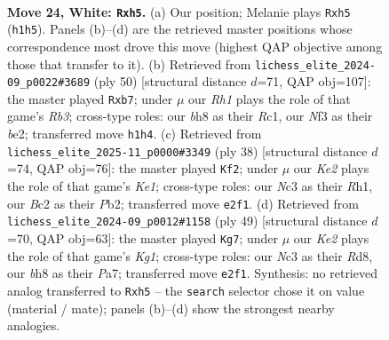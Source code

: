 \documentclass[11pt]{article}
\begin{document}
\clearpage

\begin{figure}[p]\centering
\begin{subfigure}{0.46\textwidth}\centering
\resizebox{\linewidth}{!}{%
\newchessgame
\chessboard[
  setfen={r4r1b/1ppb1k2/p7/4pp1p/2n5/P1N2N2/1PB1KPP1/R1B4R w - - 0 24},
  showmover=false,
  pgfstyle=straightmove, color=movearrow, markmove={h1-h5}
]}
\caption{}
\end{subfigure}\hfill
\begin{subfigure}{0.46\textwidth}\centering
\resizebox{\linewidth}{!}{%
\newchessgame
\chessboard[
  setfen={1n3rk1/1p3ppp/3N4/4P3/2Pp2nN/1R4P1/r3bpBP/2R4K w - - 1 26},
  showmover=false,
  pgfstyle=straightmove, color=movearrow, markmove={b3-b7}
]}
\caption{}
\end{subfigure}
\\[4pt]
\begin{subfigure}{0.46\textwidth}\centering
\resizebox{\linewidth}{!}{%
\newchessgame
\chessboard[
  setfen={r6r/4kpbp/p2p2p1/3np3/R1N5/5P2/1PP1B1PP/4K2R w K - 2 20},
  showmover=false,
  pgfstyle=straightmove, color=movearrow, markmove={e1-f2}
]}
\caption{}
\end{subfigure}\hfill
\begin{subfigure}{0.46\textwidth}\centering
\resizebox{\linewidth}{!}{%
\newchessgame
\chessboard[
  setfen={3r2k1/pnrb1p2/1p4pp/3P1p2/2PN4/2RB2P1/P4P1P/2R3K1 b - - 2 25},
  showmover=false,
  pgfstyle=straightmove, color=movearrow, markmove={g8-g7}
]}
\caption{}
\end{subfigure}
\caption{\textbf{Move 24, White: \texttt{Rxh5}.} (a) Our position; Melanie plays \texttt{Rxh5} (\texttt{h1h5}). Panels (b)--(d) are the retrieved master positions whose correspondence most drove this move (highest QAP objective among those that transfer to it). (b) Retrieved from \texttt{lichess\_elite\_2024-09\_p0022\#3689} (ply 50) [structural distance $d$=71, QAP obj=107]: the master played \texttt{Rxb7}; under $\mu$ our \emph{Rh1} plays the role of that game's \emph{Rb3}; cross-type roles: our \emph{b}h8 as their \emph{R}c1, our \emph{N}f3 as their \emph{b}e2; transferred move \texttt{h1h4}. (c) Retrieved from \texttt{lichess\_elite\_2025-11\_p0000\#3349} (ply 38) [structural distance $d$=74, QAP obj=76]: the master played \texttt{Kf2}; under $\mu$ our \emph{Ke2} plays the role of that game's \emph{Ke1}; cross-type roles: our \emph{N}c3 as their \emph{R}h1, our \emph{B}c2 as their \emph{P}b2; transferred move \texttt{e2f1}. (d) Retrieved from \texttt{lichess\_elite\_2024-09\_p0012\#1158} (ply 49) [structural distance $d$=70, QAP obj=63]: the master played \texttt{Kg7}; under $\mu$ our \emph{Ke2} plays the role of that game's \emph{Kg1}; cross-type roles: our \emph{N}c3 as their \emph{R}d8, our \emph{b}h8 as their \emph{P}a7; transferred move \texttt{e2f1}. Synthesis: no retrieved analog transferred to \texttt{Rxh5} -- the \texttt{search} selector chose it on value (material / mate); panels (b)--(d) show the strongest nearby analogies.}
\label{fig:thought-m46}
\end{figure}
\end{document}
